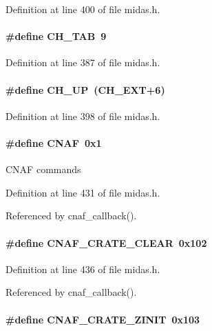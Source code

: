 Definition at line 400 of file midas.h.
\paragraph[{CH\_\-TAB}]{\setlength{\rightskip}{0pt plus 5cm}\#define CH\_\-TAB~9}\hfill\label{group__midasincludecode_ga79145d67743ce94d58ef7b8e381c5f8d}


Definition at line 387 of file midas.h.
\paragraph[{CH\_\-UP}]{\setlength{\rightskip}{0pt plus 5cm}\#define CH\_\-UP~(CH\_\-EXT+6)}\hfill\label{group__midasincludecode_gadb10e817f63e0c48ef941f4403a15ec4}


Definition at line 398 of file midas.h.
\paragraph[{CNAF}]{\setlength{\rightskip}{0pt plus 5cm}\#define CNAF~0x1}\hfill\label{group__midasincludecode_gaabc611f59210401f11ea4247291c4468}
CNAF commands 

Definition at line 431 of file midas.h.

Referenced by cnaf\_\-callback().
\paragraph[{CNAF\_\-CRATE\_\-CLEAR}]{\setlength{\rightskip}{0pt plus 5cm}\#define CNAF\_\-CRATE\_\-CLEAR~0x102}\hfill\label{group__midasincludecode_gab5458177175ac7c1d62f96395e4b2f8f}


Definition at line 436 of file midas.h.

Referenced by cnaf\_\-callback().
\paragraph[{CNAF\_\-CRATE\_\-ZINIT}]{\setlength{\rightskip}{0pt plus 5cm}\#define CNAF\_\-CRATE\_\-ZINIT~0x103}\hfill\label{group__midasincludecode_ga8ca71a69fac55838bc9bcc020f9edacf}


